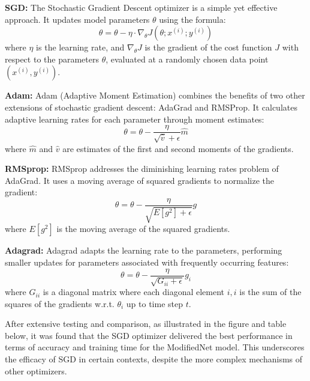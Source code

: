 \documentclass[conference]{IEEEtran}
\begin{document}
\begin{enumerate}
		\textbf{SGD:} The Stochastic Gradient Descent optimizer is a simple yet effective approach. It updates model parameters \(\theta\) using the formula: 
		\begin{equation}
			\theta = \theta - \eta \cdot \nabla_\theta J( \theta; x^{(i)}; y^{(i)})
		\end{equation}
		where \(\eta\) is the learning rate, and \(\nabla_\theta J\) is the gradient of the cost function \(J\) with respect to the parameters \(\theta\), evaluated at a randomly chosen data point \((x^{(i)}, y^{(i)})\).
		
		\textbf{Adam:} Adam (Adaptive Moment Estimation) combines the benefits of two other extensions of stochastic gradient descent: AdaGrad and RMSProp. It calculates adaptive learning rates for each parameter through moment estimates:
		\begin{equation}
			\theta = \theta - \frac{\eta}{\sqrt{\hat{v}} + \epsilon} \hat{m}
		\end{equation}
		where \(\hat{m}\) and \(\hat{v}\) are estimates of the first and second moments of the gradients.
		
		\textbf{RMSprop:} RMSprop addresses the diminishing learning rates problem of AdaGrad. It uses a moving average of squared gradients to normalize the gradient:
		\begin{equation}
			\theta = \theta - \frac{\eta}{\sqrt{E[g^2] + \epsilon}} g
		\end{equation}
		where \(E[g^2]\) is the moving average of the squared gradients.
		
		\textbf{Adagrad:} Adagrad adapts the learning rate to the parameters, performing smaller updates for parameters associated with frequently occurring features:
		\begin{equation}
			\theta = \theta - \frac{\eta}{\sqrt{G_{ii} + \epsilon}} g_i
		\end{equation}
		where \(G_{ii}\) is a diagonal matrix where each diagonal element \(i, i\) is the sum of the squares of the gradients w.r.t. \(\theta_i\) up to time step \(t\).
		
		After extensive testing and comparison, as illustrated in the figure and table below, it was found that the SGD optimizer delivered the best performance in terms of accuracy and training time for the ModifiedNet model. This underscores the efficacy of SGD in certain contexts, despite the more complex mechanisms of other optimizers.
		

\end{enumerate}
\end{document}
